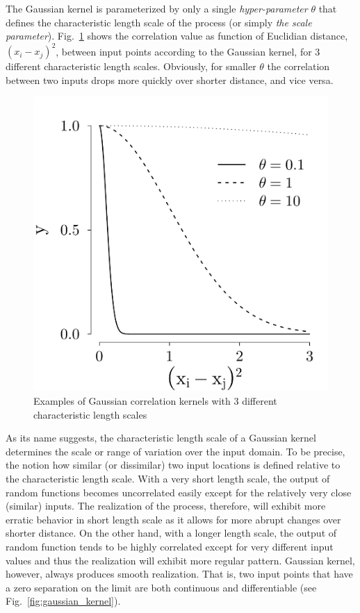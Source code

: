 The Gaussian kernel is parameterized by only a single \emph{hyper-parameter} $\theta$ that defines the characteristic length scale of the process (or simply \emph{the scale parameter}).
Fig.~\ref{fig:plot_corrfun_gauss} shows the correlation value as function of Euclidian distance, $(x_i - x_j)^2$, between input points according to the Gaussian kernel, 
for 3 different characteristic length scales.
Obviously, for smaller $\theta$ the correlation between two inputs drops more quickly over shorter distance, and vice versa.
\begin{figure}[bth]
	\centering
	\includegraphics[scale=0.5]{../figures/chapter4/figures/plotCorrFunGauss.pdf}
	\caption[Gaussian correlation kernels with 3 different characteristic length scales]{Examples of Gaussian correlation kernels with 3 different characteristic length scales}
	\label{fig:plot_corrfun_gauss}
\end{figure}
As its name suggests, the characteristic length scale of a Gaussian kernel determines the scale or range of variation over the input domain.
To be precise, the notion how similar (or dissimilar) two input locations is defined relative to the characteristic length scale.
With a very short length scale, the output of random functions becomes uncorrelated easily except for the relatively very close (similar) inputs.
The realization of the process, therefore, will exhibit more erratic behavior in short length scale as it allows for more abrupt changes over shorter distance.
On the other hand, with a longer length scale, the output of random function tends to be highly correlated except for very different input values and thus the realization will exhibit more regular pattern.
Gaussian kernel, however, always produces smooth realization. That is, two input points that have a zero separation on the limit are both continuous and differentiable (see Fig.~\ref{fig:gaussian_kernel}).

